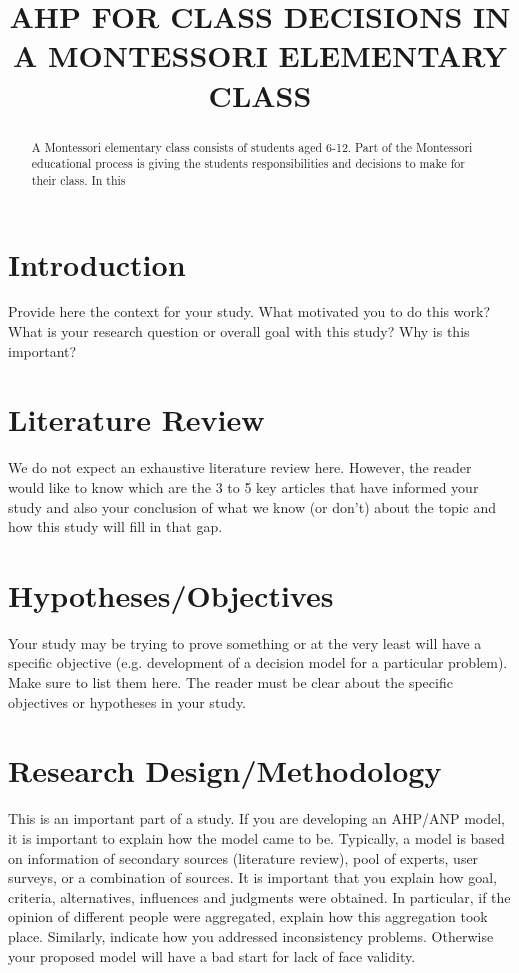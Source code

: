 \documentclass[11pt]{article}
\title{AHP FOR CLASS DECISIONS IN A MONTESSORI ELEMENTARY CLASS}
\renewcommand{\maketitle}{\begin{center}{\Large \textbf{\thetitle}} \end{center}}
\begin{document}
\maketitle
\thispagestyle{fancy}
\begin{abstract}
A Montessori elementary class consists of students aged 6-12.  Part of the Montessori educational
process is giving the students responsibilities and decisions to make for their class.  In this
\end{abstract}

\section{Introduction}
Provide here the context for your study. What motivated you to do this work? What is your research question or overall goal with this study? Why is this important? 

\section{Literature Review}
We do not expect an exhaustive literature review here. However, the reader would like to know which are the 3 to 5 key articles that have informed your study and also your conclusion of what we know (or don’t) about the topic and how this study will fill in that gap. 

\section{Hypotheses/Objectives}
Your study may be trying to prove something or at the very least will have a specific objective (e.g. development of a decision model for a particular problem). Make sure to list them here. The reader must be clear about the specific objectives or hypotheses in your study. 

\section{Research Design/Methodology}
This is an important part of a study. If you are developing an AHP/ANP model, it is important to explain how the model came to be. Typically, a model is based on information of secondary sources (literature review), pool of experts, user surveys, or a combination of sources. It is important that you explain how goal, criteria, alternatives, influences and judgments were obtained. In particular, if the opinion of different people were aggregated, explain how this aggregation took place. Similarly, indicate how you addressed inconsistency problems. Otherwise your proposed model will have a bad start for lack of face validity.
\end{document}
